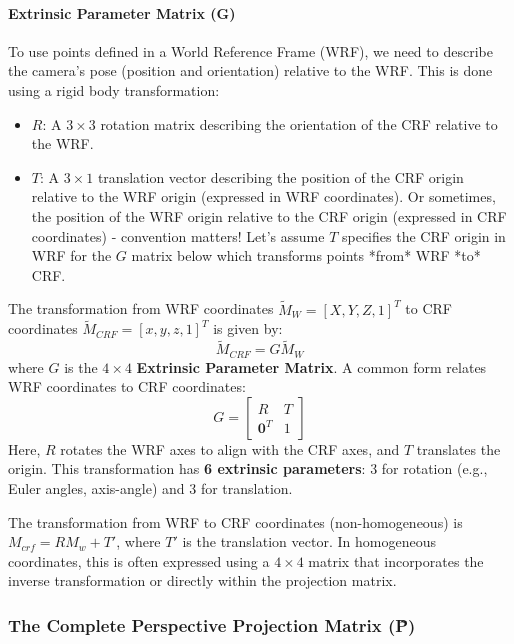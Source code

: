 \paragraph{Extrinsic Parameter Matrix (G)}
To use points defined in a World Reference Frame (WRF), we need to describe the camera's pose (position and orientation) relative to the WRF. This is done using a rigid body transformation:
\begin{itemize}
    \item $R$: A $3 \times 3$ rotation matrix describing the orientation of the CRF relative to the WRF.
    \item $T$: A $3 \times 1$ translation vector describing the position of the CRF origin relative to the WRF origin (expressed in WRF coordinates). Or sometimes, the position of the WRF origin relative to the CRF origin (expressed in CRF coordinates) - convention matters! Let's assume $T$ specifies the CRF origin in WRF for the $G$ matrix below which transforms points *from* WRF *to* CRF.
\end{itemize}
The transformation from WRF coordinates $\tilde{M}_W = [X, Y, Z, 1]^T$ to CRF coordinates $\tilde{M}_{CRF} = [x, y, z, 1]^T$ is given by:
\[
\tilde{M}_{CRF} = G \tilde{M}_W
\]
where $G$ is the $4 \times 4$ \textbf{Extrinsic Parameter Matrix}. A common form relates WRF coordinates to CRF coordinates:
\[
G = \begin{bmatrix} R & T \\ \mathbf{0}^T & 1 \end{bmatrix}
\]
Here, $R$ rotates the WRF axes to align with the CRF axes, and $T$ translates the origin. This transformation has \textbf{6 extrinsic parameters}: 3 for rotation (e.g., Euler angles, axis-angle) and 3 for translation.

The transformation from WRF to CRF coordinates (non-homogeneous) is $M_{crf} = R M_w + T'$, where $T'$ is the translation vector. In homogeneous coordinates, this is often expressed using a $4\times4$ matrix that incorporates the inverse transformation or directly within the projection matrix.

\subsubsection{The Complete Perspective Projection Matrix (\~{P})}


